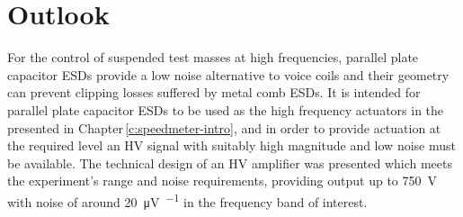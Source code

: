 % 

\section{Outlook}
For the control of suspended test masses at high frequencies, parallel plate capacitor \glspl{ESD} provide a low noise alternative to voice coils and their geometry can prevent clipping losses suffered by metal comb \glspl{ESD}. It is intended for parallel plate capacitor \glspl{ESD} to be used as the high frequency actuators in the \SSMEXPT{} presented in Chapter\,\ref{c:speedmeter-intro}, and in order to provide actuation at the required level an \gls{HV} signal with suitably high magnitude and low noise must be available. The technical design of an \gls{HV} amplifier was presented which meets the experiment's range and noise requirements, providing output up to \SI{750}{\volt} with noise of around \SI{20}{\micro\volt\per\sqrthz} in the frequency band of interest.

